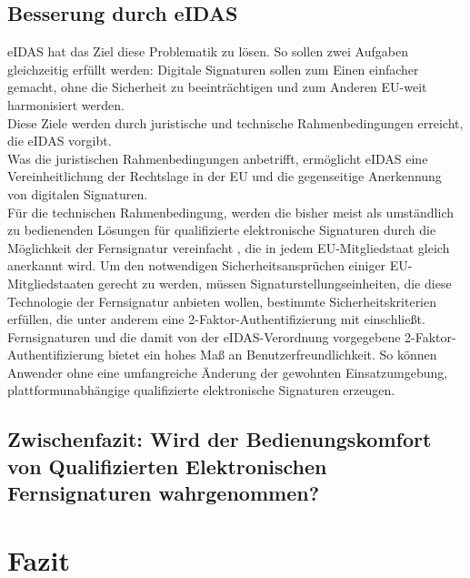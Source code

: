\documentclass[deutsch]{lib/llncs/llncs}
\begin{document}
\subsection{Besserung durch eIDAS}
eIDAS hat das Ziel diese Problematik zu lösen. So sollen zwei Aufgaben gleichzeitig erfüllt werden: Digitale Signaturen sollen zum Einen einfacher gemacht, ohne die Sicherheit zu beeinträchtigen und zum Anderen EU-weit harmonisiert werden. \cite[S. 33]{Zitat08} \\
Diese Ziele werden durch juristische und technische Rahmenbedingungen erreicht, die eIDAS vorgibt. \\
Was die juristischen Rahmenbedingungen anbetrifft, ermöglicht eIDAS eine Vereinheitlichung der Rechtslage in der EU und die gegenseitige Anerkennung von digitalen Signaturen. \cite[S. 33]{Zitat08} \\
Für die technischen Rahmenbedingung, werden die bisher meist als umständlich zu bedienenden Lösungen für qualifizierte elektronische Signaturen durch die Möglichkeit der Fernsignatur vereinfacht \cite[S. 30]{Zitat08}, die in jedem EU-Mitgliedstaat gleich anerkannt wird. Um den notwendigen Sicherheitsansprüchen einiger EU-Mitgliedstaaten gerecht zu werden, müssen Signaturstellungseinheiten, die diese Technologie der Fernsignatur anbieten wollen, bestimmte Sicherheitskriterien erfüllen, die unter anderem eine 2-Faktor-Authentifizierung mit einschließt. \\
Fernsignaturen und die damit von der eIDAS-Verordnung vorgegebene 2-Faktor-Authentifizierung bietet ein hohes Maß an Benutzerfreundlichkeit. \cite[S. 233]{Zitat09} So können Anwender ohne eine umfangreiche Änderung der gewohnten Einsatzumgebung, plattformunabhängige qualifizierte elektronische Signaturen erzeugen. 


\subsection{Zwischenfazit: Wird der Bedienungskomfort von Qualifizierten Elektronischen Fernsignaturen wahrgenommen?}


\section{Fazit}




\end{document}
